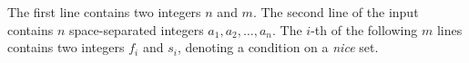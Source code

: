 The first line contains two integers $n$ and $m$.
The second line of the input contains $n$ space-separated integers $a_1,a_2,\ldots,a_n$.
The $i$-th of the following $m$ lines contains two integers $f_i$ and $s_i$, denoting a condition on a \textit{nice} set.